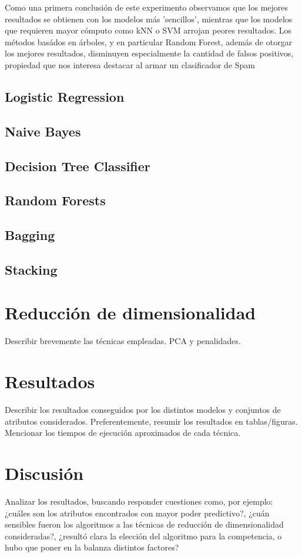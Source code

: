 \documentclass[10pt,a4paper]{article}
\begin{document}
Como una primera conclusión de este experimento observamos que los mejores resultados se obtienen con los modelos más 'sencillos', mientras que los modelos que requieren mayor cómputo como kNN o SVM arrojan peores resultados.
Los métodos basádos en árboles, y en particular Random Forest, además de otorgar los mejores resultados, disminuyen especialmente la cantidad de falsos positivos, propiedad que nos interesa destacar al armar un clasificador de Spam



\subsection{Logistic Regression}
\subsection{Naive Bayes}
\subsection{Decision Tree Classifier}
\subsection{Random Forests}
\subsection{Bagging}
\subsection{Stacking}

\section{Reducción de dimensionalidad}

Describir brevemente las técnicas empleadas. PCA y penalidades.

\section{Resultados}
Describir los resultados conseguidos por los distintos modelos y conjuntos de atributos considerados. Preferentemente, resumir los resultados en tablas/figuras. Mencionar los tiempos de ejecución aproximados de cada técnica.


\section{Discusión}

Analizar los resultados, buscando responder cuestiones como, por ejemplo: ¿cuáles son los atributos encontrados con mayor poder predictivo?, ¿cuán sensibles fueron los algoritmos a las técnicas de reducción de dimensionalidad consideradas?, ¿resultó clara la elección del algoritmo para la competencia, o hubo que poner en la balanza distintos factores?
\end{document}
